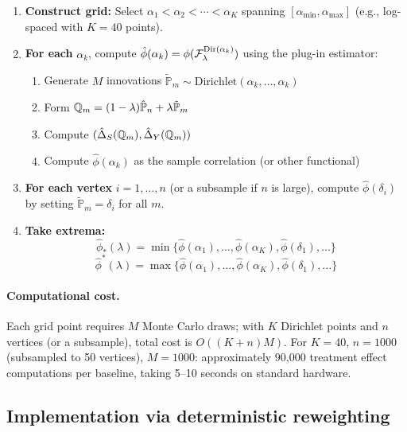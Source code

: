 \documentclass{article}
\newcommand{\PP}{\mathbb{P}}
\begin{document}
\begin{enumerate}
    \item \textbf{Construct grid:} Select $\alpha_1 < \alpha_2 < \cdots < \alpha_K$ spanning $[\alpha_{\min}, \alpha_{\max}]$ (e.g., log-spaced with $K = 40$ points).

    \item \textbf{For each} $\alpha_k$, compute $\hat{\phi}(\alpha_k) = \phi(\mathcal{F}_\lambda^{\text{Dir}(\alpha_k)})$ using the plug-in estimator:
          \begin{enumerate}
              \item Generate $M$ innovations $\tilde{\PP}_m \sim \text{Dirichlet}(\alpha_k, \ldots, \alpha_k)$
              \item Form $\Q_m = (1-\lambda)\hat{\PP}_n + \lambda\tilde{\PP}_m$
              \item Compute $(\hat{\Delta}_S(\mathbb{Q}_m), \hat{\Delta}_Y(\mathbb{Q}_m))$
              \item Compute $\hat{\phi}(\alpha_k)$ as the sample correlation (or other functional)
          \end{enumerate}

    \item \textbf{For each vertex} $i = 1, \ldots, n$ (or a subsample if $n$ is large), compute $\hat{\phi}(\delta_i)$ by setting $\tilde{\PP}_m = \delta_i$ for all $m$.

    \item \textbf{Take extrema:}
          \[
              \hat{\phi}_*(\lambda) = \min\{\hat{\phi}(\alpha_1), \ldots, \hat{\phi}(\alpha_K), \hat{\phi}(\delta_1), \ldots\}
          \]
          \[
              \hat{\phi}^*(\lambda) = \max\{\hat{\phi}(\alpha_1), \ldots, \hat{\phi}(\alpha_K), \hat{\phi}(\delta_1), \ldots\}
          \]
\end{enumerate}

\paragraph{Computational cost.}
Each grid point requires $M$ Monte Carlo draws; with $K$ Dirichlet points and $n$ vertices (or a subsample), total cost is $O((K + n)M)$. For $K = 40$, $n = 1000$ (subsampled to 50 vertices), $M = 1000$: approximately 90,000 treatment effect computations per baseline, taking 5--10 seconds on standard hardware.

\subsection{Implementation via deterministic reweighting}
\end{document}
